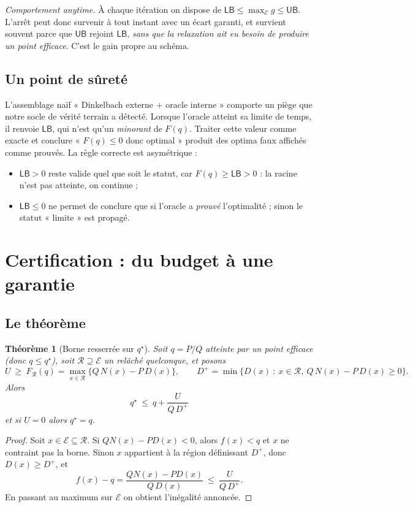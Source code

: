 \documentclass[11pt,a4paper]{article}
\theoremstyle{plain}
\newtheorem{theorem}{Théorème}
\theoremstyle{remark}
\newcommand{\Ecal}{\mathcal{E}}
\newcommand{\Rcal}{\mathcal{R}}
\newcommand{\qs}{q^{\star}}
\begin{document}
\noindent
\emph{Comportement anytime.} À chaque itération on dispose de
$\textsf{LB}\le\max_{\Ecal}g\le\textsf{UB}$. L'arrêt peut donc survenir à
tout instant avec un écart garanti, et survient souvent parce que
$\textsf{UB}$ rejoint $\textsf{LB}$, \emph{sans que la relaxation ait eu
besoin de produire un point efficace}. C'est le gain propre au schéma.

\subsection{Un point de sûreté}

L'assemblage naïf « Dinkelbach externe $+$ oracle interne » comporte un piège
que notre socle de vérité terrain a détecté. Lorsque l'oracle atteint sa
limite de temps, il renvoie $\textsf{LB}$, qui n'est qu'un \emph{minorant} de
$F(q)$. Traiter cette valeur comme exacte et conclure « $F(q)\le 0$ donc
optimal » produit des optima faux affichés comme prouvés. La règle correcte
est asymétrique :
\begin{itemize}[leftmargin=*,itemsep=1pt]
\item $\textsf{LB}>0$ reste valide quel que soit le statut, car
      $F(q)\ge\textsf{LB}>0$ : la racine n'est pas atteinte, on continue ;
\item $\textsf{LB}\le 0$ ne permet de conclure que si l'oracle a
      \emph{prouvé} l'optimalité ; sinon le statut « limite » est propagé.
\end{itemize}

\section{Certification : du budget à une garantie}

\subsection{Le théorème}

\begin{theorem}[Borne resserrée sur $\qs$]\label{th:bound}
Soit $q=P/Q$ atteinte par un point efficace (donc $q\le\qs$), soit
$\Rcal\supseteq\Ecal$ un relâché quelconque, et posons
\[
  U\ \ge\ F_{\Rcal}(q)=\max_{x\in\Rcal}\{Q\,N(x)-P\,D(x)\},
  \qquad
  D^{+}=\min\bigl\{D(x)\ :\ x\in\Rcal,\ Q\,N(x)-P\,D(x)\ge 0\bigr\}.
\]
Alors
\[
  \boxed{\ \qs\ \le\ q+\frac{U}{Q\,D^{+}}\ }
\]
et si $U=0$ alors $\qs=q$.
\end{theorem}

\begin{proof}
Soit $x\in\Ecal\subseteq\Rcal$. Si $Q N(x)-P D(x)<0$, alors $f(x)<q$ et $x$
ne contraint pas la borne. Sinon $x$ appartient à la région définissant
$D^{+}$, donc $D(x)\ge D^{+}$, et
\[
  f(x)-q=\frac{Q N(x)-P D(x)}{Q\,D(x)}\ \le\ \frac{U}{Q\,D^{+}} .
\]
En passant au maximum sur $\Ecal$ on obtient l'inégalité annoncée.
\end{proof}
\end{document}
